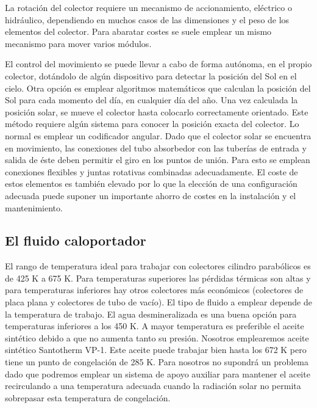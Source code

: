 La rotación del colector requiere un mecanismo de accionamiento, eléctrico o hidráulico,
dependiendo en muchos casos de las dimensiones y el peso de los elementos del colector. Para abaratar costes se suele emplear un mismo mecanismo para mover varios módulos.

El control del movimiento se puede llevar a cabo de forma autónoma, en el propio colector, dotándolo de algún dispositivo para detectar la posición del Sol en el cielo. Otra opción es emplear algoritmos matemáticos que calculan la posición del Sol para cada momento del día, en cualquier día del año. Una vez calculada la posición solar, se mueve el colector hasta colocarlo correctamente orientado. Este método requiere algún sistema para conocer la posición exacta del colector. Lo normal es emplear un codificador angular.
Dado que el colector solar se encuentra en movimiento, las conexiones del tubo absorbedor con las tuberías de entrada y salida de éste deben permitir el giro en los puntos de unión. Para esto se emplean conexiones flexibles y juntas rotativas combinadas adecuadamente. El coste de estos elementos es también elevado por lo que la elección de una configuración adecuada puede suponer un importante ahorro de costes en la instalación y el mantenimiento.

\subsection{El fluido caloportador}
\label{fluidocaloportador}

El rango de temperatura ideal para trabajar con colectores cilindro parabólicos es de 425 K a 675 K.
Para temperaturas superiores las pérdidas térmicas son altas y para temperaturas inferiores hay otros
colectores más económicos (colectores de placa plana y colectores de tubo de vacío).
El tipo de fluido a emplear depende de la temperatura de trabajo. El agua desmineralizada es una
buena opción para temperaturas inferiores a los 450 K. A mayor temperatura es preferible el aceite
sintético debido a que no aumenta tanto su presión. Nosotros emplearemos aceite sintético
Santotherm VP-1. Este aceite puede trabajar bien hasta los 672 K pero tiene un punto de
congelación de 285 K. Para nosotros no supondrá un problema dado que podremos emplear un
sistema de apoyo auxiliar para mantener el aceite recirculando a una temperatura adecuada cuando
la radiación solar no permita sobrepasar esta temperatura de congelación.
